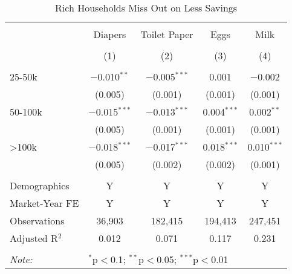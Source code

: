 
\begin{table}[!htbp] \centering
  \caption{Rich Households Miss Out on Less Savings}
  \label{tab:lowestPrice}
\begin{tabular}{@{\extracolsep{5pt}}lcccc}
\\[-1.8ex]\hline
\hline \\[-1.8ex]
 & Diapers & Toilet Paper & Eggs & Milk \\
\\[-1.8ex] & (1) & (2) & (3) & (4)\\
\hline \\[-1.8ex]
 25-50k & $-$0.010$^{**}$ & $-$0.005$^{***}$ & 0.001 & $-$0.002 \\
  & (0.005) & (0.001) & (0.001) & (0.001) \\
  50-100k & $-$0.015$^{***}$ & $-$0.013$^{***}$ & 0.004$^{***}$ & 0.002$^{**}$ \\
  & (0.005) & (0.001) & (0.001) & (0.001) \\
  >100k & $-$0.018$^{***}$ & $-$0.017$^{***}$ & 0.018$^{***}$ & 0.010$^{***}$ \\
  & (0.005) & (0.002) & (0.002) & (0.001) \\
 \hline \\[-1.8ex]
Demographics & Y & Y & Y & Y \\
Market-Year FE & Y & Y & Y & Y \\
Observations & 36,903 & 182,415 & 194,413 & 247,451 \\
Adjusted R$^{2}$ & 0.012 & 0.071 & 0.117 & 0.231 \\
\hline
\hline \\[-1.8ex]
\textit{Note:}  & \multicolumn{4}{l}{$^{*}$p$<$0.1; $^{**}$p$<$0.05; $^{***}$p$<$0.01} \\
\end{tabular}
\end{table}

